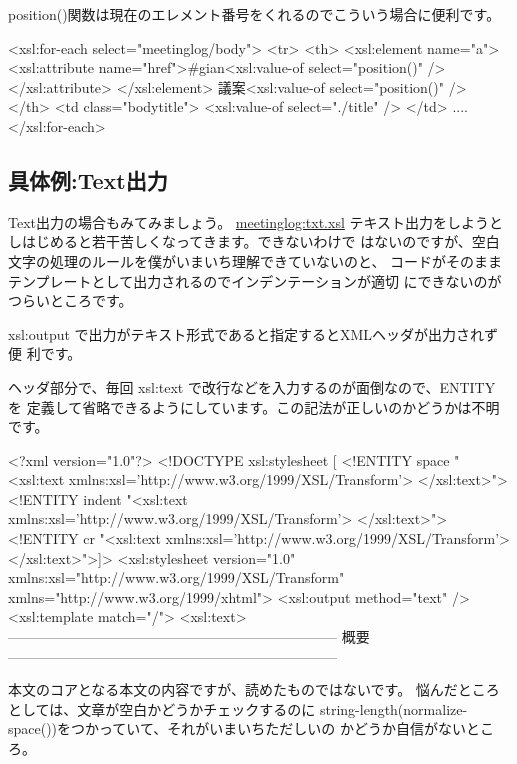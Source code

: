 \documentclass[mingoth,a4paper]{jsarticle}
\begin{document}
position()関数は現在のエレメント番号をくれるのでこういう場合に便利です。

\begin{commandline}
           <xsl:for-each select="meetinglog/body">
	      <tr>
		<th>
		  <xsl:element name="a">
		    <xsl:attribute name="href">#gian<xsl:value-of select="position()" /></xsl:attribute>
		  </xsl:element>
		  議案<xsl:value-of select="position()" />
		</th>
		<td class="bodytitle">
		  <xsl:value-of select="./title" />
		</td>
 ....
 </xsl:for-each>
\end{commandline}

\subsection{具体例:Text出力}

Text出力の場合もみてみましょう。
\url{meetinglog:txt.xsl}
テキスト出力をしようとしはじめると若干苦しくなってきます。できないわけで
はないのですが、空白文字の処理のルールを僕がいまいち理解できていないのと、
コードがそのままテンプレートとして出力されるのでインデンテーションが適切
にできないのがつらいところです。

xsl:output で出力がテキスト形式であると指定するとXMLヘッダが出力されず便
利です。

ヘッダ部分で、毎回 xsl:text で改行などを入力するのが面倒なので、ENTITY を
定義して省略できるようにしています。この記法が正しいのかどうかは不明です。

\begin{commandline}
<?xml version="1.0"?>
<!DOCTYPE xsl:stylesheet [
<!ENTITY space  "<xsl:text xmlns:xsl='http://www.w3.org/1999/XSL/Transform'> </xsl:text>">
<!ENTITY indent "<xsl:text xmlns:xsl='http://www.w3.org/1999/XSL/Transform'>  </xsl:text>">
<!ENTITY cr     "<xsl:text xmlns:xsl='http://www.w3.org/1999/XSL/Transform'>
</xsl:text>">]>
  <xsl:stylesheet version="1.0"
    xmlns:xsl="http://www.w3.org/1999/XSL/Transform"
    xmlns="http://www.w3.org/1999/xhtml">
  <xsl:output method="text" />
  <xsl:template match="/">
    <xsl:text>-----------------------------------------------------------------------
概要
-----------------------------------------------------------------------
\end{commandline}

本文のコアとなる本文の内容ですが、読めたものではないです。
悩んだところとしては、文章が空白かどうかチェックするのに
string-length(normalize-space())をつかっていて、それがいまいちただしいの
かどうか自信がないところ。
\end{document}
